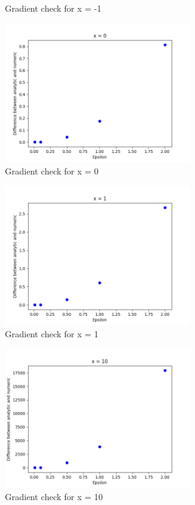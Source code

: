 \documentclass[submit]{harvardml}
\begin{document}
\begin{enumerate}
\begin{center}
        Gradient check for x = -1
    \end{center}
    \begin{center}
        \includegraphics[width=0.6\textwidth]{x0}\\
        Gradient check for x = 0
    \end{center}
    \begin{center}
        \includegraphics[width=0.6\textwidth]{x1}\\
        Gradient check for x = 1
    \end{center}
    \begin{center}
        \includegraphics[width=0.6\textwidth]{x10}\\
        Gradient check for x = 10
    \end{center}
    \begin{center}

\end{center}
\end{enumerate}
\end{document}
